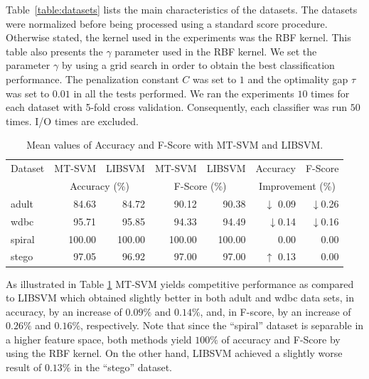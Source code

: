 \documentclass{llncs}
\begin{document}
Table~\ref{table:datasets} lists the main characteristics of the datasets. The datasets were normalized before being processed using a standard score procedure. %
Otherwise stated, the kernel used in the experiments was the \ac{RBF} kernel. This table also presents the $\gamma$ parameter used in the \ac{RBF} kernel. We set the parameter $\gamma$ by using a grid search in order to obtain the best classification performance. The penalization constant $C$ was set to $1$ and the optimality gap $\tau$ was set to $0.01$ in all the tests performed. We ran the experiments $10$ times for each dataset with 5-fold cross validation. Consequently, each classifier was run $50$ times.  I/O times are excluded.

\begin{table}[!ht]
  \centering
  \caption{Mean values of Accuracy and F-Score with MT-SVM and LIBSVM.}
    \begin{tabular}{|l|r|r|r|r|r|r|} \hline
    Dataset & MT-SVM & LIBSVM & MT-SVM & LIBSVM & Accuracy & F-Score \\
          & \multicolumn{2}{|c|}{Accuracy (\%)} & \multicolumn{2}{|c|}{F-Score (\%)} & \multicolumn{2}{|c|}{Improvement (\%)} \\ \hline
    adult & 84.63 & 84.72 & 90.12 & 90.38 & $\downarrow$ 0.09 & $\downarrow$0.26 \\
    wdbc  & 95.71 & 95.85 & 94.33 & 94.49 & $\downarrow$0.14 & $\downarrow$0.16 \\
    spiral & 100.00 & 100.00 & 100.00 & 100.00 & 0.00  & 0.00 \\ \hline
    stego & 97.05 & 96.92 & 97.00 & 97.00 & $\uparrow$ 0.13  & 0.00 \\ \hline
    \end{tabular}
  \label{tab:results_classification_acc_fscore}
\end{table}

As illustrated in Table \ref{tab:results_classification_acc_fscore}  MT-SVM yields competitive performance as compared  to LIBSVM which obtained slightly better in both adult and wdbc data sets, in accuracy, by an increase of $0.09\%$ and $0.14\%$, and, in F-score, by an increase of  $0.26\%$ and $0.16\%$, respectively. Note that since the ``spiral'' dataset is separable in a higher feature space, both methods yield $100 \%$ of accuracy and F-Score by using the \ac{RBF} kernel. On the other hand, LIBSVM achieved a slightly worse result of $0.13\%$ in the ``stego'' dataset.
\end{document}
